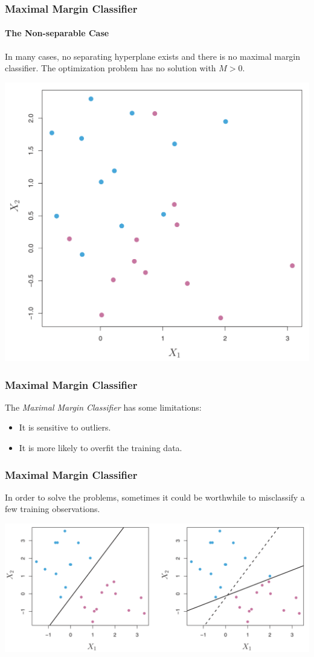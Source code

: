 \documentclass{beamer}
\begin{document}
\begin{frame}
    \frametitle{Maximal Margin Classifier}
    \framesubtitle{The Non-separable Case}
    In many cases, no separating hyperplane exists and there is no maximal 
    margin classifier. The optimization problem has no solution with $M>0$.
    \begin{center}
        \includegraphics[scale=0.25]{images/nonseparable.png}
    \end{center}
\end{frame}



\begin{frame}
    \frametitle{Maximal Margin Classifier}
    The \textit{Maximal Margin Classifier} has some limitations:
    \begin{itemize}
        \item It is sensitive to outliers. 
        \item It is more likely to overfit the training data.
    \end{itemize}
\end{frame}

\begin{frame}
    \frametitle{Maximal Margin Classifier}  
    In order to solve the problems, sometimes it could be worthwhile to misclassify 
    a few training observations. 
    \begin{center}
        \includegraphics[scale=0.25]{images/outliers.png}
    \end{center}
\end{frame}
\end{document}
